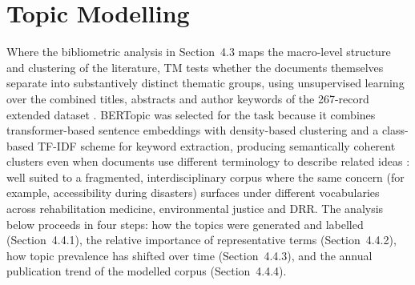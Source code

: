 \documentclass[12pt,a4paper]{report}
\begin{document}
\section{Topic Modelling}
Where the bibliometric analysis in Section~4.3 maps the macro-level structure and clustering of the literature, TM tests whether the documents themselves separate into substantively distinct thematic groups, using unsupervised learning over the combined titles, abstracts and author keywords of the 267-record extended dataset \cite{blei_2012_probabilistic,barde2017overview}. BERTopic was selected for the task because it combines transformer-based sentence embeddings with density-based clustering and a class-based TF-IDF scheme for keyword extraction, producing semantically coherent clusters even when documents use different terminology to describe related ideas \cite{grootendorst_2022_bertopic,reimers_2019_sentence}: well suited to a fragmented, interdisciplinary corpus where the same concern (for example, accessibility during disasters) surfaces under different vocabularies across rehabilitation medicine, environmental justice and DRR. The analysis below proceeds in four steps: how the topics were generated and labelled (Section~4.4.1), the relative importance of representative terms (Section~4.4.2), how topic prevalence has shifted over time (Section~4.4.3), and the annual publication trend of the modelled corpus (Section~4.4.4).
\end{document}

